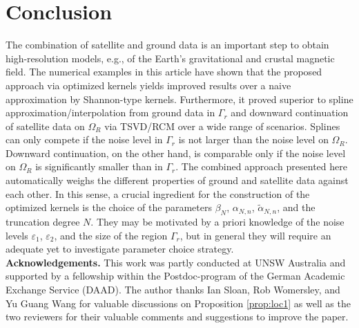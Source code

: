 \documentclass[a4paper, 10pt]{article}
\numberwithin{equation}{section}
\theoremstyle{definition}
\newcommand{\eps}{\ensuremath{\varepsilon}}
\begin{document}
\section{Conclusion}\label{sec:concl}%
The combination of satellite and ground data is an important step to obtain high-resolution models, e.g., of the Earth's gravitational and crustal magnetic field. The numerical examples in this article have shown that the proposed approach via optimized kernels yields improved results over a naive approximation by Shannon-type kernels. Furthermore, it proved superior to spline approximation/interpolation from ground data in $\Gamma_r$ and downward continuation of satellite data on $\Omega_R$ via TSVD/RCM over a wide range of scenarios. Splines can only compete if the noise level in $\Gamma_r$ is not larger than the noise level on $\Omega_R$. Downward continuation, on the other hand, is comparable only if the noise level on $\Omega_R$ is significantly smaller than in $\Gamma_r$. The combined approach presented here automatically weighs the different properties of ground and satellite data against each other. In this sense, a crucial ingredient for the construction of the optimized kernels is the choice of the parameters $\beta_N$, $\alpha_{N,n}$, $\tilde{\alpha}_{N,n}$, and the truncation degree $N$. They may be motivated by a priori knowledge of the noise levels $\eps_1$, $\eps_2$, and the size of the region $\Gamma_r$, but in general they will require an adequate yet to investigate parameter choice strategy.
\\[2ex]

\textbf{Acknowledgements.} This work was partly conducted at UNSW Australia and supported by a fellowship within the Postdoc-program of the German Academic Exchange Service (DAAD). The author thanks Ian Sloan, Rob Womersley, and Yu  Guang Wang for valuable discussions on Proposition \ref{prop:loc1} as well as the two reviewers for their valuable comments and suggestions to improve the paper.
\end{document}
